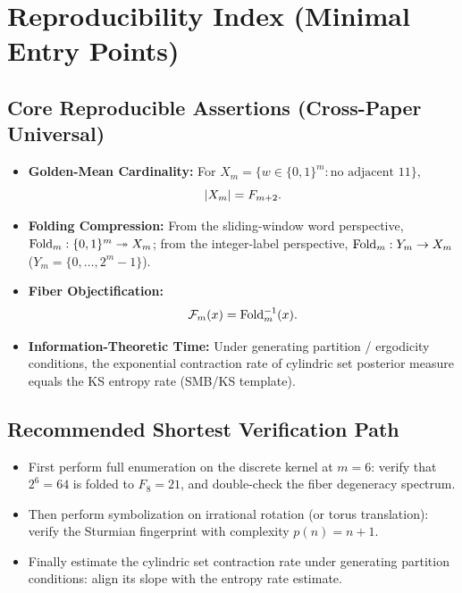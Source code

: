 \section{Reproducibility Index (Minimal Entry Points)}

\subsection{Core Reproducible Assertions (Cross-Paper Universal)}

\begin{itemize}
  \item \textbf{Golden-Mean Cardinality:}
  For $X_m=\{w\in\{0,1\}^m:\text{no adjacent }11\}$,
  \[
  \left\lvert X_m\right\rvert=F_{m+2}.
  \]
  \item \textbf{Folding Compression:}
  From the sliding-window word perspective, $\mathrm{Fold}_m:\{0,1\}^m\twoheadrightarrow X_m$;
  from the integer-label perspective, $\mathrm{Fold}_m:Y_m\to X_m$ ($Y_m=\{0,\dots,2^m-1\}$).
  \item \textbf{Fiber Objectification:}
  \[
  \mathcal{F}_m(x)=\mathrm{Fold}_m^{-1}(x).
  \]
  \item \textbf{Information-Theoretic Time:}
  Under generating partition / ergodicity conditions, the exponential contraction rate of cylindric set posterior measure equals the KS entropy rate (SMB/KS template).
\end{itemize}

\subsection{Recommended Shortest Verification Path}

\begin{itemize}
  \item First perform full enumeration on the discrete kernel at $m=6$: verify that $2^6=64$ is folded to $F_8=21$, and double-check the fiber degeneracy spectrum.
  \item Then perform symbolization on irrational rotation (or torus translation): verify the Sturmian fingerprint with complexity $p(n)=n+1$.
  \item Finally estimate the cylindric set contraction rate under generating partition conditions: align its slope with the entropy rate estimate.
\end{itemize}

